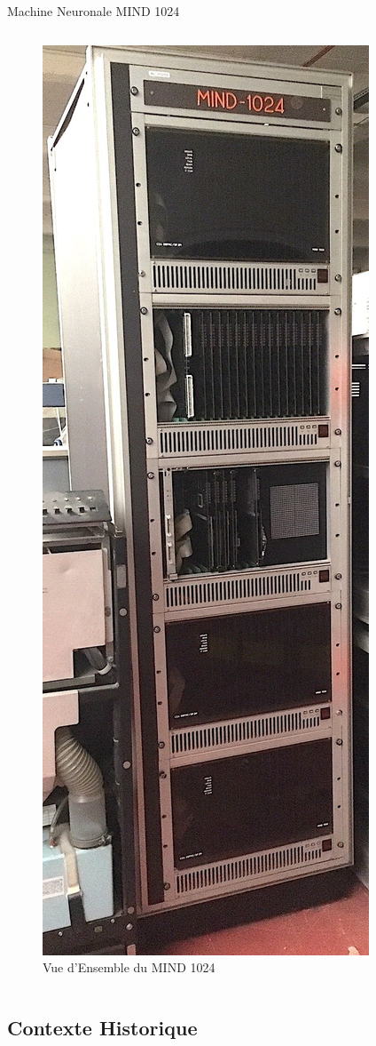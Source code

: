 \documentclass{beamer}
\begin{document}
\begin{frame}{Machine Neuronale MIND 1024}
\begin{columns}[T]
\begin{figure}
                \includegraphics[width=0.5\linewidth]{pic/Vue d'Ensemble.jpeg}
                \caption{Vue d'Ensemble du MIND 1024}
            \end{figure}
    \end{columns}
\end{frame}

\subsection{Contexte Historique}
\end{document}
